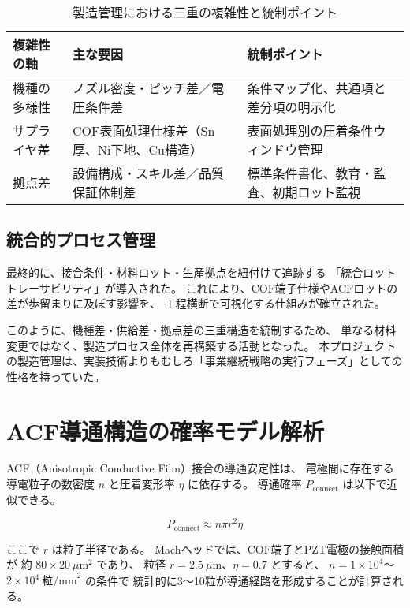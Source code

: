 \documentclass[conference]{IEEEtran}
\begin{document}
\begin{table}[t]
\centering
\footnotesize
\caption{製造管理における三重の複雑性と統制ポイント}
\label{tab:complexity}
\renewcommand{\arraystretch}{1.1}
\begin{tabularx}{\columnwidth}{@{}p{2.3cm} Y Y@{}}
\toprule
複雑性の軸 & 主な要因 & 統制ポイント \\
\midrule
機種の多様性 &
ノズル密度・ピッチ差／電圧条件差 &
条件マップ化、共通項と差分項の明示化 \\
\addlinespace[2pt]
サプライヤ差 &
COF表面処理仕様差（Sn厚、Ni下地、Cu構造） &
表面処理別の圧着条件ウィンドウ管理 \\
\addlinespace[2pt]
拠点差 &
設備構成・スキル差／品質保証体制差 &
標準条件書化、教育・監査、初期ロット監視 \\
\bottomrule
\end{tabularx}
\end{table}

\subsection{統合的プロセス管理}
最終的に、接合条件・材料ロット・生産拠点を紐付けて追跡する  
「統合ロットトレーサビリティ」が導入された。  
これにより、COF端子仕様やACFロットの差が歩留まりに及ぼす影響を、  
工程横断で可視化する仕組みが確立された。  

このように、機種差・供給差・拠点差の三重構造を統制するため、  
単なる材料変更ではなく、製造プロセス全体を再構築する活動となった。  
本プロジェクトの製造管理は、実装技術よりもむしろ「事業継続戦略の実行フェーズ」としての性格を持っていた。

\section{ACF導通構造の確率モデル解析}

ACF（Anisotropic Conductive Film）接合の導通安定性は、
電極間に存在する導電粒子の数密度 $n$ と圧着変形率 $\eta$ に依存する。
導通確率 $P_{\text{connect}}$ は以下で近似できる。

\begin{equation}
P_{\text{connect}} \approx n \pi r^2 \eta
\end{equation}

ここで $r$ は粒子半径である。
Machヘッドでは、COF端子とPZT電極の接触面積が
約 $80 \times 20~\mu\text{m}^2$ であり、
粒径 $r = 2.5~\mu$m、$\eta = 0.7$ とすると、
$n = 1\times10^4$〜$2\times10^4~\text{粒/mm}^2$ の条件で
統計的に3〜10粒が導通経路を形成することが計算される。
\end{document}

